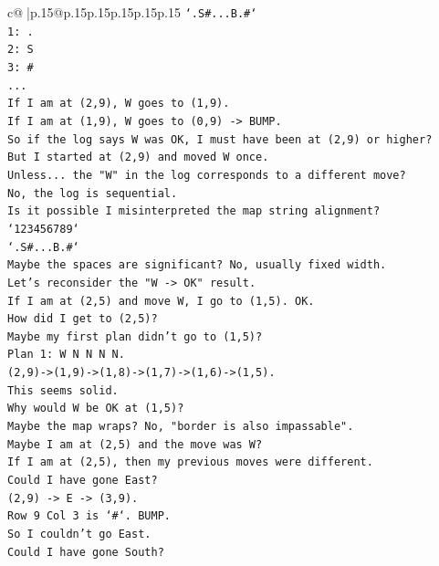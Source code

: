 \documentclass{article}
\begin{document}
{\begin{supertabular}{c@{$\;$}|p{.15\linewidth}@{}p{.15\linewidth}p{.15\linewidth}p{.15\linewidth}p{.15\linewidth}p{.15\linewidth}}
{{{\texttt{`.S\#...B.\#`} \\
\texttt{1: .} \\
\texttt{2: S} \\
\texttt{3: \#} \\
\texttt{...} \\
\texttt{If I am at (2,9), W goes to (1,9).} \\
\texttt{If I am at (1,9), W goes to (0,9) {-}> BUMP.} \\
\texttt{So if the log says W was OK, I must have been at (2,9) or higher?} \\
\texttt{But I started at (2,9) and moved W once.} \\
\texttt{Unless... the "W" in the log corresponds to a different move?} \\
\texttt{No, the log is sequential.} \\
\texttt{Is it possible I misinterpreted the map string alignment?} \\
\texttt{`123456789`} \\
\texttt{`.S\#...B.\#`} \\
\texttt{Maybe the spaces are significant? No, usually fixed width.} \\
\texttt{Let's reconsider the "W {-}> OK" result.} \\
\texttt{If I am at (2,5) and move W, I go to (1,5). OK.} \\
\texttt{How did I get to (2,5)?} \\
\texttt{Maybe my first plan didn't go to (1,5)?} \\
\texttt{Plan 1: W N N N N.} \\
\texttt{(2,9){-}>(1,9){-}>(1,8){-}>(1,7){-}>(1,6){-}>(1,5).} \\
\texttt{This seems solid.} \\
\texttt{Why would W be OK at (1,5)?} \\
\texttt{Maybe the map wraps? No, "border is also impassable".} \\
\texttt{Maybe I am at (2,5) and the move was W?} \\
\texttt{If I am at (2,5), then my previous moves were different.} \\
\texttt{Could I have gone East?} \\
\texttt{(2,9) {-}> E {-}> (3,9).} \\
\texttt{Row 9 Col 3 is `\#`. BUMP.} \\
\texttt{So I couldn't go East.} \\
\texttt{Could I have gone South?} \\
}}}
\end{supertabular}}
\end{document}
